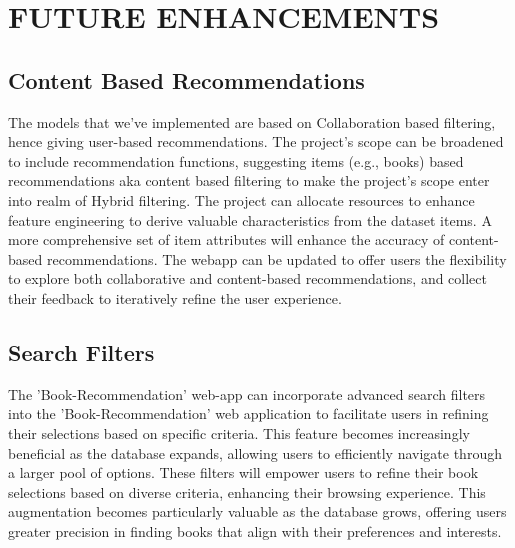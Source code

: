 \chapter{FUTURE ENHANCEMENTS}

\section*{Content Based Recommendations}
The models that we've implemented are based on Collaboration based filtering, hence giving user-based recommendations. The project's scope can be broadened to include recommendation functions, suggesting items (e.g., books) based recommendations aka content based filtering to make the project's scope enter into realm of Hybrid filtering. The project can allocate resources to enhance feature engineering to derive valuable characteristics from the dataset items. A more comprehensive set of item attributes will enhance the accuracy of content-based recommendations. The webapp can be updated to offer users the flexibility to explore both collaborative and content-based recommendations, and collect their feedback to iteratively refine the user experience.

\section*{Search Filters}
The 'Book-Recommendation' web-app can incorporate advanced search filters into the 'Book-Recommendation' web application to facilitate users in refining their selections based on specific criteria. This feature becomes increasingly beneficial as the database expands, allowing users to efficiently navigate through a larger pool of options. These filters will empower users to refine their book selections based on diverse criteria, enhancing their browsing experience. This augmentation becomes particularly valuable as the database grows, offering users greater precision in finding books that align with their preferences and interests.

